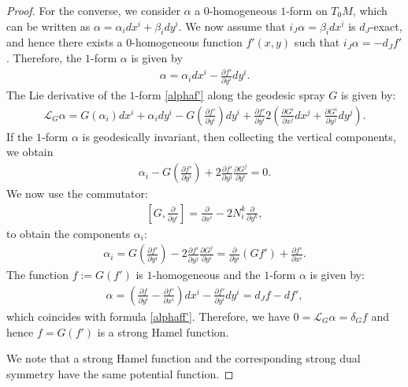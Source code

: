 \documentclass[oneside,english]{amsart}
\theoremstyle{definition}
\theoremstyle{plain}
\theoremstyle{plain}
\theoremstyle{plain}
\theoremstyle{remark}
\theoremstyle{remark}
\theoremstyle{remark}
\begin{document}
\begin{proof}
For the converse, we consider $\alpha$ a $0$-homogeneous $1$-form on $T_0M$, which can be written as
$ \alpha=\alpha_i dx^i+\beta_i dy^i$. We now assume that $i_J\alpha = \beta_i dx^i$ is $d_J$-exact, and hence there exists a $0$-homogeneous function $f'(x,y)$ such that $i_J\alpha=-d_Jf'$.
Therefore, the $1$-form $\alpha$ is given by
\begin{eqnarray} \label{alphaf'}
\alpha=\alpha_i dx^i - \frac{\partial f'}{\partial y^i}dy^i.
\end{eqnarray}
 The Lie derivative of the $1$-form \eqref{alphaf'} along the geodesic spray $G$ is given by:
\begin{eqnarray*}
\mathcal{L}_G\alpha = G(\alpha_i)dx^i + \alpha_i dy^i - G\left(\frac{\partial f'}{\partial y^i}\right) dy^i + \frac{\partial f'}{\partial y^i} 2\left(\frac{\partial G^i}{\partial x^j}dx^j + \frac{\partial G^i}{\partial y^j} dy^j\right).  
\end{eqnarray*}
If the $1$-form $\alpha$ is geodesically invariant, then collecting the vertical components, we obtain 
\begin{eqnarray*}
\alpha_i - G\left(\frac{\partial f'}{\partial y^i}\right) + 2 \frac{\partial f'}{\partial y^j} \frac{\partial G^j}{\partial y^i}=0. 
\end{eqnarray*}
We now use the commutator: 
\begin{eqnarray*}
\left[G, \frac{\partial}{\partial y^i}\right] = \frac{\partial}{\partial x^i} - 2N^k_i\frac{\partial}{\partial y^k},
\end{eqnarray*}
to obtain the components $\alpha_i$:
\begin{eqnarray*}
\alpha_i = G\left(\frac{\partial f'}{\partial y^i}\right) - 2 \frac{\partial f'}{\partial y^j} \frac{\partial G^j}{\partial y^i} = \frac{\partial}{\partial y^i}\left(Gf'\right) + \frac{\partial f'}{\partial x^i}.
\end{eqnarray*}
The function $f:=G(f')$ is $1$-homogeneous and the $1$-form $\alpha$ is given by:
\begin{eqnarray*}
\alpha=\left(\frac{\partial f}{\partial y^i} -  \frac{\partial f'}{\partial x^i}\right) dx^i - \frac{\partial f'}{\partial y^i}dy^i = d_Jf-df',
\end{eqnarray*} 
 which coincides with formula \eqref{alphaff'}. Therefore, we have $0=\mathcal{L}_G\alpha=\delta_Gf$ and hence $f=G(f')$ is a strong Hamel function. 
 
We note that a strong Hamel function and the corresponding strong dual symmetry have the same potential function. 


\end{proof}
\end{document}
